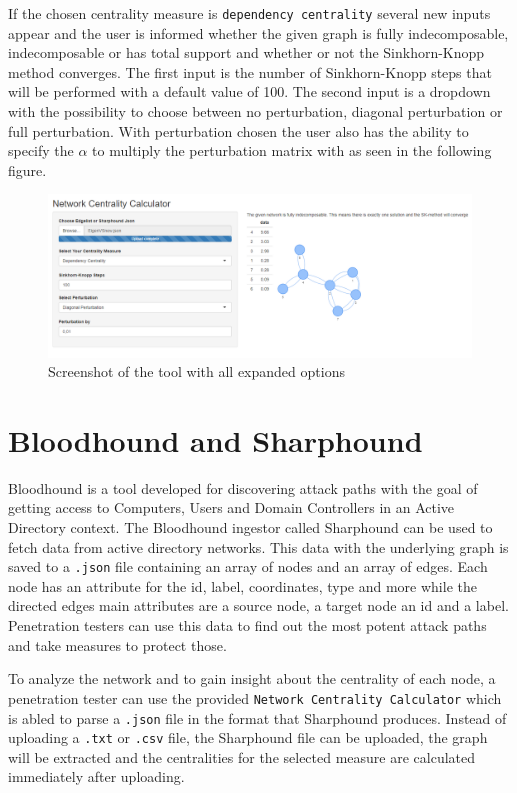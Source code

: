 If the chosen centrality measure is \texttt{dependency centrality} several new inputs appear
and the user is informed whether the given graph is fully indecomposable, indecomposable or has 
total support and whether or not the Sinkhorn-Knopp method converges.
The first input is the number of Sinkhorn-Knopp steps that will be performed with a default
value of 100. The second input is a dropdown with the possibility to choose between no perturbation,
diagonal perturbation or full perturbation. With perturbation chosen the user also has the ability
to specify the $\alpha$ to multiply the perturbation matrix with as seen in the following figure.
\begin{figure}[ht]
    \includegraphics[width=\textwidth]{images/figures/calculatorDependencyExample.PNG}        
    \caption{Screenshot of the tool with all expanded options}
\end{figure}

\section{Bloodhound and Sharphound}

Bloodhound is a tool developed for discovering attack paths with the goal of getting access to
Computers, Users and Domain Controllers in an Active Directory context.
The Bloodhound ingestor called Sharphound can be used to fetch data from active directory networks.
This data with the underlying graph is saved to a \texttt{.json} file containing an array of 
nodes and an array of edges.
Each node has an attribute for the id, label, coordinates, type and more while 
the directed edges main attributes are a source node, a target node an id and a label.
Penetration testers can use this data to find out the most potent attack paths and take
measures to protect those. 

To analyze the network and to gain insight about the centrality of each node, a penetration
tester can use the provided \texttt{Network Centrality Calculator} which is abled to parse a 
\texttt{.json} file in the format that Sharphound produces. Instead of uploading a \texttt{.txt}
or \texttt{.csv} file, the Sharphound file can be uploaded, the graph will be extracted
and the centralities for the selected measure are calculated immediately after uploading.

